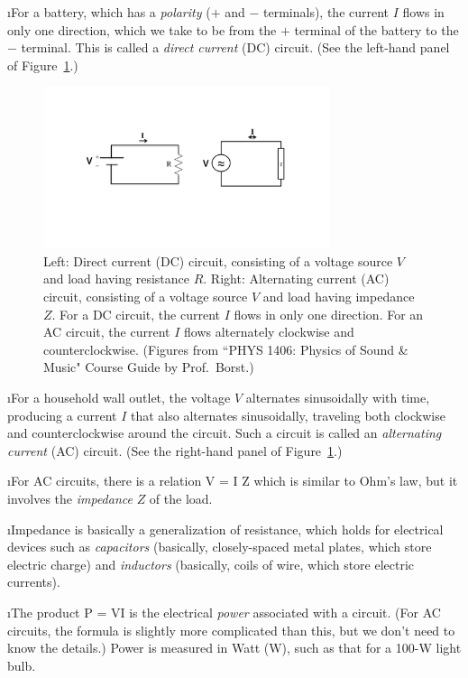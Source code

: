 \i For a battery, which has a {\em polarity} ($+$ and 
$-$ terminals), the current $I$ flows in only one direction, 
which we take to be from the $+$ terminal of the battery 
to the $-$ terminal.
This is called a {\em direct current} (DC) circuit.
(See the left-hand panel of Figure~\ref{f:circuits_DC_AC}.)
%
\begin{figure}[htbp]
\begin{center}
\includegraphics[width=0.75\textwidth]{circuits_DC_AC}
\caption{Left: Direct current (DC) circuit, consisting
of a voltage source $V$ and load having resistance $R$.
Right: Alternating current (AC) circuit, consisting of
a voltage source $V$ and load having impedance $Z$.
For a DC circuit, the current $I$ flows in only one direction.
For an AC circuit, the current $I$ flows alternately clockwise and
counterclockwise.
(Figures from ``PHYS 1406: Physics of Sound \& Music" 
Course Guide by Prof.~Borst.)}
\label{f:circuits_DC_AC}
\end{center}
\end{figure}

\i For a household wall outlet, the voltage $V$ alternates
sinusoidally with time, producing a current $I$ that 
also alternates sinusoidally, traveling both clockwise and 
counterclockwise around the circuit.
Such a circuit is called an {\em alternating current} (AC) circuit.
(See the right-hand panel of Figure~\ref{f:circuits_DC_AC}.)

\i For AC circuits, there is a relation 
%
\be
V = I Z
\ee
%
which is similar to Ohm's law, but it involves the {\em impedance}
$Z$ of the load.

\i Impedance is basically a generalization of resistance, which holds
for electrical devices such as {\em capacitors} (basically,
closely-spaced metal plates, which store electric charge) and {\em
inductors} (basically, coils of wire, which store electric currents).

\i The product 
%
\be
P = VI
\ee
%
is the electrical {\em power} associated with a circuit.
(For AC circuits, the formula is slightly more complicated than this,
but we don't need to know the details.)
Power is measured in Watt (W), such as that for a 100-W light bulb.

